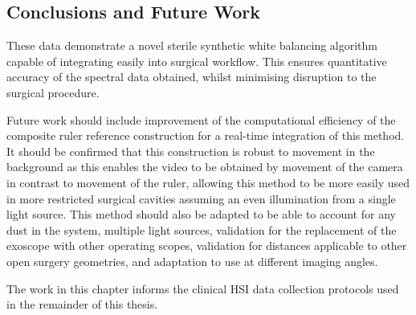 \subsection{Conclusions and Future Work}
These data demonstrate a novel sterile synthetic white balancing algorithm capable of integrating easily into surgical workflow. This ensures quantitative accuracy of the spectral data obtained, whilst minimising disruption to the surgical procedure.

Future work should include improvement of the computational efficiency of the composite ruler reference construction for a real-time integration of this method. It should be confirmed that this construction is robust to movement in the background as this enables the video to be obtained by movement of the camera in contrast to movement of the ruler, allowing this method to be more easily used in more restricted surgical cavities assuming an even illumination from a single light source. This method should also be adapted to be able to account for any dust in the system, multiple light sources, validation for the replacement of the exoscope with other operating scopes, validation for distances applicable to other open surgery geometries, and adaptation to use at different imaging angles.

The work in this chapter informs the clinical HSI data collection protocols used in the remainder of this thesis. 




